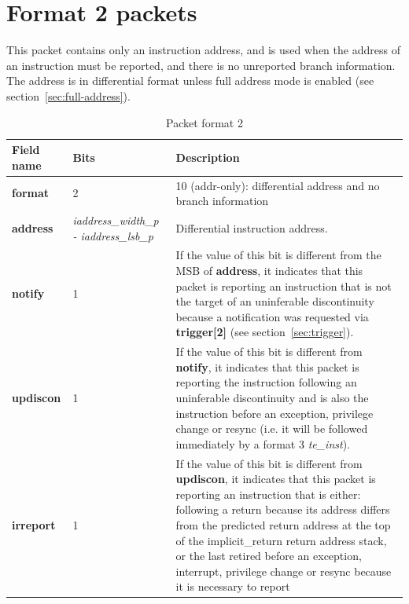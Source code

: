 \section{Format 2 packets} \label{sec:format2}

This packet contains only an instruction address, and is used when the address of an instruction must be reported, 
and there is no unreported branch information.  The address is in differential format unless full address mode is
enabled (see section~\ref{sec:full-address}).

\begin{table}[!h]
  \centering
  \caption{Packet format 2}
  \label{tab:te_inst2}
  \begin{tabulary}{\textwidth}{|l|p{35mm}|p{90mm}|}
    \hline
    {\bf Field name} & {\bf Bits} & {\bf Description} \\
    \hline
    \textbf{format}	& 2	& 10 (addr-only): differential address and no branch information\\
    \hline
    \textbf{address} & \textit {iaddress\_width\_p - iaddress\_lsb\_p} & 
              Differential instruction address.\\ 
    \hline
    \textbf{notify}	& 1 & 
                If the value of this bit is different from the MSB of \textbf{address}, it indicates that this 
                packet is reporting an instruction that is not the target of an uninferable discontinuity 
                because a notification was requested via \textbf{trigger[2]} (see section~\ref{sec:trigger}). \\
    \hline
    \textbf{updiscon}	& 1 & 
                If the value of this bit is different from \textbf{notify}, it indicates that this 
                packet is reporting the instruction following an uninferable discontinuity and is also the 
                instruction before an exception, privilege change or resync 
                (i.e. it will be followed immediately by a format 3 \textit{te\_inst}).\\
    \hline
    \textbf{irreport}	& 1 & 
                If the value of this bit is different from \textbf{updiscon}, it indicates that this packet is
                reporting an instruction that is either: \newline
                following a return because its address differs from the predicted return address at the top of 
                the implicit\_return return address stack, or \newline
                the last retired before an exception, interrupt, privilege change or resync because it is necessary to report 

\end{tabulary}
\end{table}
